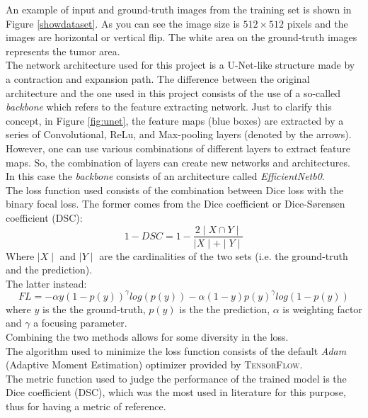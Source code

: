 \documentclass{standalone}
\begin{document}
An example of input and ground-truth images from the training set is shown in Figure \ref{showdataset}.
As you can see the image size is $512 \times 512$ pixels and the images are horizontal or vertical flip.
The white area on the ground-truth images represents the tumor area.
\\
The network architecture used for this project is a U-Net-like structure made by a contraction and expansion path.
The difference between the original architecture and the one used in this project consists of the use of a so-called \textit{backbone} which refers to the feature extracting network.
Just to clarify this concept, in Figure \ref{fig:unet}, the feature maps (blue boxes) are extracted by a series of Convolutional, ReLu, and Max-pooling layers (denoted by the arrows).
However, one can use various combinations of different layers to extract feature maps. 
So, the combination of layers can create new networks and architectures.
In this case the \textit{backbone} consists of an architecture called \textit{EfficientNetb0}\cite{EfficientNet}.
\\
The loss function used consists of the combination between Dice loss with the binary focal loss\cite{focal}.
The former comes from the Dice coefficient or Dice-Sørensen coefficient (DSC):
\begin{equation}
    1 - DSC = 1 - \frac{2 \mid X \cap Y \mid}{\mid X \mid + \mid Y \mid}
\end{equation}
Where $\mid X \mid$  and $\mid Y \mid$ are the cardinalities of the two sets (i.e. the ground-truth and the prediction).
\\
The latter instead: 
\begin{equation}
    FL = - \alpha y(1 - p(y))^{\gamma}log(p(y)) - \alpha (1 - y) p(y)^{\gamma}log(1 - p(y))
\end{equation}
where $y$ is the the ground-truth, $p(y)$ is the the prediction, $\alpha$ is weighting factor and $\gamma$ a focusing parameter.
\\
Combining the two methods allows for some diversity in the loss.
\\
The algorithm used to minimize the loss function consists of the default \textit{Adam} (Adaptive Moment Estimation) optimizer provided by \textsc{TensorFlow}.
\\
The metric function used to judge the performance of the trained model is the Dice coefficient (DSC), which was the most used in literature for this purpose, thus for having a metric of reference.
\end{document}
